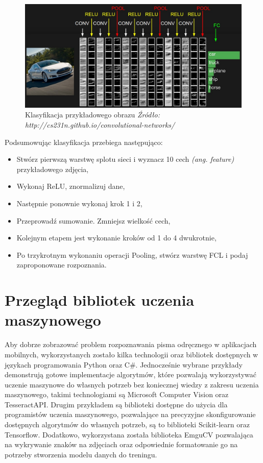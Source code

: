 \documentclass[brudnopis]{xmgr}
\begin{document}
\begin{figure}[!tbh]
\centering
\includegraphics[width=.8\hsize]{fig/convnet}
\caption{Klasyfikacja przykładowego obrazu \emph{Źródło: http://cs231n.github.io/convolutional-networks/}}
\end{figure}

Podsumowując klasyfikacja przebiega następująco:
\begin{itemize}
\item
Stwórz pierwszą warstwę splotu sieci i wyznacz 10 cech \emph{(ang. feature)} przykładowego zdjęcia,
\item
Wykonaj ReLU, znormalizuj dane,
\item
Następnie ponownie wykonaj krok 1 i 2,
\item
Przeprowadź sumowanie. Zmniejsz wielkość cech,
\item
Kolejnym etapem jest wykonanie kroków od 1 do 4 dwukrotnie,
\item
Po trzykrotnym wykonaniu operacji Pooling, stwórz warstwę FCL i podaj zaproponowane rozpoznania.
\end{itemize}

\chapter{Przegląd bibliotek uczenia maszynowego}
Aby dobrze zobrazować problem rozpoznawania pisma odręcznego w aplikacjach mobilnych, wykorzystanych zostało kilka technologii oraz bibliotek dostępnych w językach programowania Python oraz C\#. Jednocześnie wybrane przykłady demonstrują gotowe implementacje algorytmów, które pozwalają wykorzystywać uczenie maszynowe do własnych potrzeb bez koniecznej wiedzy z zakresu uczenia maszynowego, takimi technologiami są Microsoft Computer Vision\cite{9} oraz TesseractAPI\cite{10}. Drugim przykładem są biblioteki dostępne do użycia dla programistów uczenia maszynowego, pozwalające na precyzyjne skonfigurowanie dostępnych algorytmów do własnych potrzeb, są to biblioteki Scikit-learn oraz Tensorflow. Dodatkowo, wykorzystana została biblioteka EmguCV pozwalająca na wykrywanie znaków na zdjęciach oraz odpowiednie formatowanie go na potrzeby stworzenia modelu danych do treningu.
\end{document}
